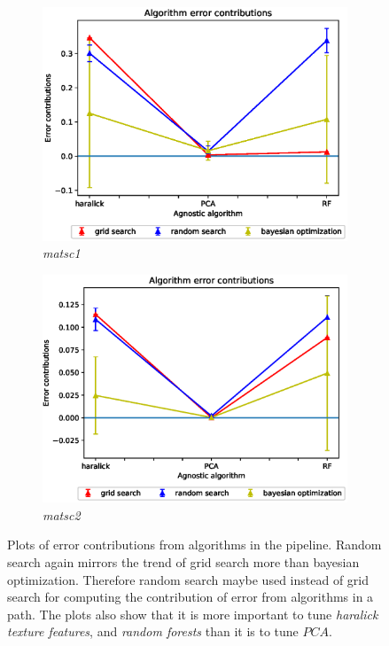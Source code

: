 \begin{figure}[ht!]
\begin{subfigure}{.5\textwidth}
  \centering
  \includegraphics[scale=0.37]{img/EP/agnostic_error_alg_matsc_dataset1.eps}
  \caption{\textit{matsc1}}
  \label{fig:sfig3}
\end{subfigure}%
\begin{subfigure}{.5\textwidth}
  \centering
  \includegraphics[scale=0.37]{img/EP/agnostic_error_alg_matsc_dataset2.eps}
  \caption{\textit{matsc2}}
  \label{fig:sfig4}
\end{subfigure}

\caption{Plots of error contributions from algorithms in the pipeline. Random search again mirrors the trend of grid search more than bayesian optimization. Therefore random search maybe used instead of grid search for computing the contribution of error from algorithms in a path. The plots also show that it is more important to tune \textit{haralick texture features}, and \textit{random forests} than it is to tune  $PCA$. }
\label{fig:eq_alg}
\end{figure}

